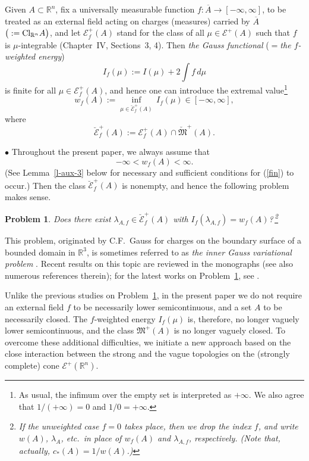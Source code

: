 \documentclass[12pt,a4paper,reqno]{amsart} %
\theoremstyle{lause}
\theoremstyle{maaritelma}
\theoremstyle{lause}
\newtheorem{problem}[theorem]{Problem}
\theoremstyle{maaritelma}
\numberwithin{equation}{section}
\begin{document}
Given $A\subset\mathbb R^n$, fix a universally measurable function $f:\overline{A}\to[-\infty,\infty]$, to be treated as an external field acting on charges (measures) carried by $\overline{A}$ $\big({}:={\rm Cl}_{\mathbb R^n}A\bigr)$, and let $\mathcal E^+_f(A)$ stand for the class of all $\mu\in\mathcal E^+(A)$ such that $f$ is $\mu$-in\-te\-g\-r\-ab\-le \cite{B2} (Chapter~IV, Sections~3, 4).
Then {\it the Gauss functional} ({\it $=$\/the $f$-wei\-gh\-t\-ed energy})
\begin{equation*}\label{fen}
 I_f(\mu):=I(\mu)+2\int f\,d\mu
\end{equation*}
is finite for all $\mu\in\mathcal E^+_f(A)$, and hence one can introduce the extremal value\footnote{As usual, the infimum over the empty set is interpreted as $+\infty$. We also agree that $1/(+\infty)=0$ and $1/0 = +\infty$.}
\begin{equation*}\label{wf}
w_f(A):=\inf_{\mu\in\breve{\mathcal E}^+_f(A)}\,I_f(\mu)\in[-\infty,\infty],
\end{equation*}
where
\[\breve{\mathcal E}^+_f(A):=\mathcal E^+_f(A)\cap\breve{\mathfrak M}^+(A).\]

$\bullet$ Throughout the present paper, we always assume that
\begin{equation}\label{fin}
-\infty<w_f(A)<\infty.
\end{equation}
(See Lemma~\ref{l-aux-3} below
for necessary and sufficient conditions for (\ref{fin}) to occur.) Then the class $\breve{\mathcal E}^+_f(A)$ is nonempty, and hence the following problem makes sense.

\begin{problem}\label{pr-main} Does there exist $\lambda_{A,f}\in\breve{\mathcal E}^+_f(A)$ with $I_f(\lambda_{A,f})=w_f(A)$?\,\footnote{If the {\it unweighted} case $f=0$ takes place, then we drop the index $f$, and write $w(A)$, $\lambda_A$, etc.\ in place of $w_f(A)$ and $\lambda_{A,f}$, respectively. (Note that, actually, $c_*(A)=1/w(A)$.)}
\end{problem}

This problem, originated by C.F.~Gauss \cite{Gau} for charges on the boundary surface of a bounded domain in $\mathbb R^3$,
is sometimes referred to as {\it the inner Gauss variational problem} \cite{O}. Recent results on this topic are reviewed in the monographs \cite{BHS,ST} (see also numerous references therein); for the latest works on Problem~\ref{pr-main}, see \cite{CSW,Dr0}.

Unlike the previous studies on Problem~\ref{pr-main}, in the present paper we do not require an external field $f$ to be necessarily lower semicontinuous, and a set $A$ to be necessarily closed. The $f$-we\-i\-g\-h\-t\-ed energy $I_f(\mu)$ is, therefore, no longer vaguely lower semicontinuous, and the class $\mathfrak M^+(A)$ is no longer vaguely closed. To overcome these additional difficulties, we initiate a new approach based on the close interaction between the strong and the vague topologies on the (strongly complete) cone $\mathcal E^+(\mathbb R^n)$.
\end{document}
